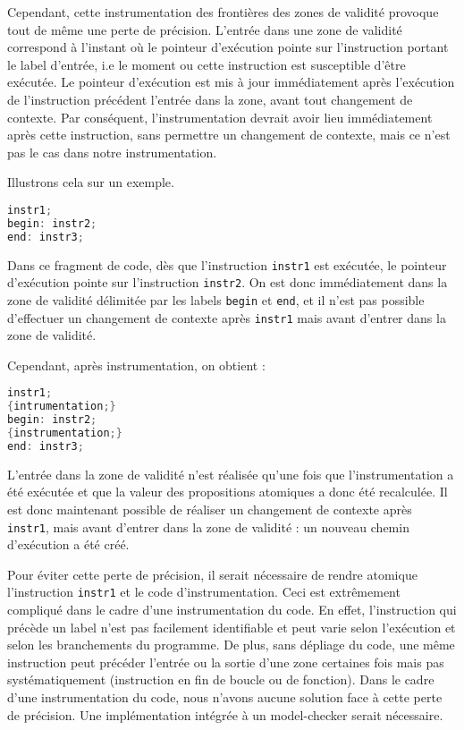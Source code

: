 Cependant, cette instrumentation des frontières des zones de validité
provoque tout de même une perte de précision. L'entrée dans une zone de
validité correspond à l'instant où le pointeur d'exécution pointe sur
l'instruction portant le label d'entrée, i.e le moment ou cette
instruction est susceptible d'être exécutée. Le pointeur d'exécution est
mis à jour immédiatement après l'exécution de l'instruction précédent
l'entrée dans la zone, avant tout changement de contexte. Par
conséquent, l'instrumentation devrait avoir lieu immédiatement après
cette instruction, sans permettre un changement de contexte, mais ce
n'est pas le cas dans notre instrumentation.

Illustrons cela sur un exemple.

\begin{lstlisting}[language=C]
instr1;
begin: instr2;
end: instr3;
\end{lstlisting}

Dans ce fragment de code, dès que l'instruction \texttt{instr1} est
exécutée, le pointeur d'exécution pointe sur l'instruction
\texttt{instr2}. On est donc immédiatement dans la zone de validité
délimitée par les labels \texttt{begin} et \texttt{end}, et il
n'est pas possible d'effectuer un changement de contexte après
\texttt{instr1} mais avant d'entrer dans la zone de validité.

Cependant, après instrumentation, on obtient :

\begin{lstlisting}[language=C]
instr1;
{intrumentation;}
begin: instr2;
{instrumentation;}
end: instr3;
\end{lstlisting}

L'entrée dans la zone de validité n'est réalisée qu'une fois que
l'instrumentation a été exécutée et que la valeur des propositions
atomiques a donc été recalculée. Il est donc maintenant possible de
réaliser un changement de contexte après \texttt{instr1}, mais avant
d'entrer dans la zone de validité : un nouveau chemin d'exécution a été
créé.

Pour éviter cette perte de précision, il serait nécessaire de rendre
atomique l'instruction \texttt{instr1} et le code d'instrumentation.
Ceci est extrêmement compliqué dans le cadre d'une instrumentation du
code. En effet, l'instruction qui précède un label n'est pas facilement
identifiable et peut varie selon l'exécution et selon les branchements
du programme. De plus, sans dépliage du code, une même instruction peut
précéder l'entrée ou la sortie d'une zone certaines fois mais pas
systématiquement (instruction en fin de boucle ou de fonction). Dans le
cadre d'une instrumentation du code, nous n'avons aucune solution face à
cette perte de précision. Une implémentation intégrée à un model-checker
serait nécessaire.

